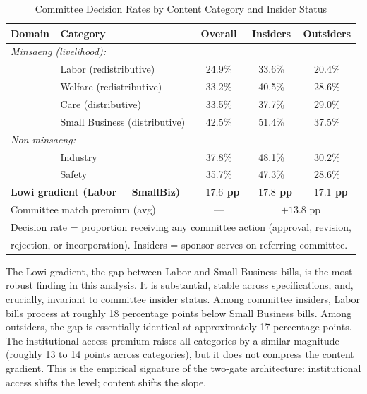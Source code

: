 \documentclass[11pt]{article}
\begin{document}
\begin{table}[H]
\centering
\caption{Committee Decision Rates by Content Category and Insider Status}
\label{tab:lowi}
\begin{tabular}{llccc}
\toprule
Domain & Category & Overall & Insiders & Outsiders \\
\midrule
\multicolumn{5}{l}{\textit{Minsaeng (livelihood):}} \\
& Labor (redistributive) & 24.9\% & 33.6\% & 20.4\% \\
& Welfare (redistributive) & 33.2\% & 40.5\% & 28.6\% \\
& Care (distributive) & 33.5\% & 37.7\% & 29.0\% \\
& Small Business (distributive) & 42.5\% & 51.4\% & 37.5\% \\[4pt]
\multicolumn{5}{l}{\textit{Non-minsaeng:}} \\
& Industry & 37.8\% & 48.1\% & 30.2\% \\
& Safety & 35.7\% & 47.3\% & 28.6\% \\
\midrule
\multicolumn{2}{l}{\textbf{Lowi gradient (Labor $-$ SmallBiz)}} & \textbf{$-17.6$ pp} & \textbf{$-17.8$ pp} & \textbf{$-17.1$ pp} \\
\multicolumn{2}{l}{Committee match premium (avg)} & --- & \multicolumn{2}{c}{$+13.8$ pp} \\
\bottomrule
\multicolumn{5}{l}{\footnotesize Decision rate = proportion receiving any committee action (approval, revision,} \\
\multicolumn{5}{l}{\footnotesize rejection, or incorporation). Insiders = sponsor serves on referring committee.} \\
\end{tabular}
\end{table}

The Lowi gradient, the gap between Labor and Small Business bills, is the most robust finding in this analysis. It is substantial, stable across specifications, and, crucially, invariant to committee insider status. Among committee insiders, Labor bills process at roughly 18 percentage points below Small Business bills. Among outsiders, the gap is essentially identical at approximately 17 percentage points. The institutional access premium raises all categories by a similar magnitude (roughly 13 to 14 points across categories), but it does not compress the content gradient. This is the empirical signature of the two-gate architecture: institutional access shifts the level; content shifts the slope.
\end{document}
